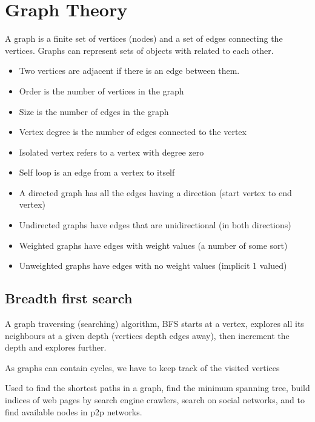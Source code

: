 \documentclass[]{article}
\begin{document}
	
\section{Graph Theory}
A graph is a finite set of vertices (nodes) and a set of edges connecting the vertices. Graphs can represent sets of objects with related to each other.

\begin{itemize}
	\item Two vertices are adjacent if there is an edge between them.
	\item Order is the number of vertices in the graph
	\item Size is the number of edges in the graph
	\item Vertex degree is the number of edges connected to the vertex
	\item Isolated vertex refers to a vertex with degree zero
	\item Self loop is an edge from a vertex to itself
	\item A directed graph has all the edges having a direction (start vertex to end vertex)
	\item Undirected graphs have edges that are unidirectional (in both directions)
	\item Weighted graphs have edges with weight values (a number of some sort)
	\item Unweighted graphs have edges with no weight values (implicit 1 valued)
\end{itemize}

\subsection{Breadth first search}
A graph traversing (searching) algorithm, BFS starts at a vertex, explores all its neighbours at a given depth (vertices depth edges away), then increment the depth and explores further.

As graphs can contain cycles, we have to keep track of the visited vertices

Used to find the shortest paths in a graph, find the minimum spanning tree, build indices of web pages by search engine crawlers, search on social networks, and to find available nodes in p2p networks.
\end{document}
